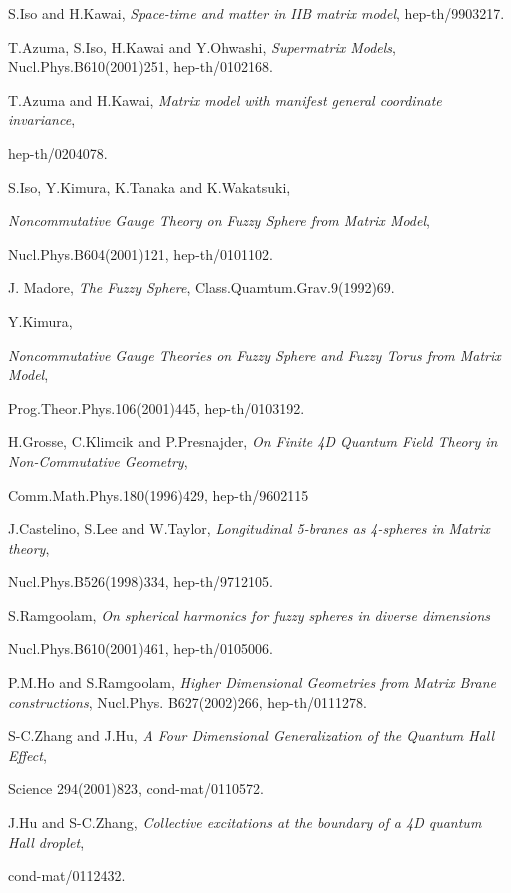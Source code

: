 \documentclass[a4paper,11pt]{article}
\begin{document}
\begin{thebibliography}{99}
S.Iso and H.Kawai, 
{\it Space-time and matter in IIB matrix model}, 
hep-th/9903217.

T.Azuma, S.Iso, H.Kawai and Y.Ohwashi, 
{\it Supermatrix Models}, 
Nucl.Phys.B610(2001)251, 
hep-th/0102168. 

T.Azuma and H.Kawai, 
{\it Matrix model with manifest general coordinate invariance}, 

hep-th/0204078. 

S.Iso, Y.Kimura, K.Tanaka and K.Wakatsuki,  

{\it Noncommutative Gauge Theory on Fuzzy Sphere from Matrix Model}, 

Nucl.Phys.B604(2001)121, hep-th/0101102. 

J. Madore, 
{\it The Fuzzy Sphere}, 
Class.Quamtum.Grav.9(1992)69.


Y.Kimura, 

{\it Noncommutative Gauge Theories on Fuzzy Sphere and Fuzzy Torus 
from Matrix Model}, 

Prog.Theor.Phys.106(2001)445, hep-th/0103192.   




H.Grosse, C.Klimcik and P.Presnajder, 
{\it On Finite 4D Quantum Field Theory in Non-Commutative Geometry}, 

Comm.Math.Phys.180(1996)429, 
hep-th/9602115

J.Castelino, S.Lee and W.Taylor, 
{\it Longitudinal 5-branes as 4-spheres in Matrix theory}, 

Nucl.Phys.B526(1998)334, 
hep-th/9712105.  

S.Ramgoolam, 
{\it On spherical harmonics for fuzzy spheres in diverse dimensions}

Nucl.Phys.B610(2001)461, hep-th/0105006. 

P.M.Ho and S.Ramgoolam, 
{\it Higher Dimensional Geometries from Matrix Brane constructions}, 
Nucl.Phys. B627(2002)266, 
hep-th/0111278. 

S-C.Zhang and J.Hu, 
{\it A Four Dimensional Generalization of the Quantum Hall Effect}, 

Science 294(2001)823, 
cond-mat/0110572.  

J.Hu and S-C.Zhang, 
{\it Collective excitations at the boundary of a 4D quantum Hall droplet}, 

cond-mat/0112432.  


\end{thebibliography}
\end{document}
